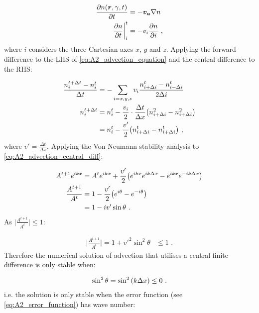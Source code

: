 \begin{equation}
    \begin{aligned}
    \pdv{n\qty(\boldsymbol{r},\gamma,t)}{t}&=-\boldsymbol{v_a}\nabla n  \\
    \pdv{n}{t}\bigg|_{i}^t&=-v_i\pdv{n}{i}\text{ ,} 
    \end{aligned} \label{eq:A2_advection_equation}
\end{equation}
\noindent where $i$ considers the three Cartesian axes $x$, $y$ and $z$. Applying the forward difference to the LHS of \autoref{eq:A2_advection_equation} and the central difference to the RHS:

\begin{equation}
    \begin{aligned}
    \frac{n^{t+\Delta t}_i-n^t_i}{\Delta t}&=-\sum_{i=x,y,z} v_i\frac{n_{i+\Delta i}^t-n_{i-\Delta i}^t}{2\Delta i} \\
    n_i^{t+\Delta t}&=n_i^t-\frac{v_i}{2}\cdot\frac{\Delta t}{\Delta x}\qty(n_{i+\Delta i}^2-n_{i+\Delta i}^2) \\
    &=n_i^t-\frac{v'}{2}\qty(n_{i+\Delta i}^t-n_{i+\Delta i}^t)\text{ ,} 
    \end{aligned} \label{eq:A2_advection_central_diff}
\end{equation}
\noindent where $v'=\frac{\Delta t}{\Delta x}$. Applying the Von Neumann stability analysis to \autoref{eq:A2_advection_central_diff}:

\begin{equation}
    \begin{aligned}
    A^{t+1}e^{ikx}&=A^te^{ikx}+\frac{v'}{2}\qty(e^{ikx}e^{ik\Delta x}-e^{ikx}e^{-ik\Delta x}) \\
    \frac{A^{t+1}}{A^t}&=1-\frac{v'}{2}\qty(e^{i\theta}-e^{-i\theta}) \\
    &=1-iv'\sin\theta\text{ .} 
    \end{aligned}
\end{equation}
\noindent As $\lvert \frac{A^{t+1}}{A^t}\rvert\leq 1$:

\begin{equation}
    \begin{aligned}
        \bigg| \frac{A^{t+1}}{A^t}\bigg|=1+v'^2\sin^2\theta &\leq1\text{ .} 
    \end{aligned}
\end{equation}
\noindent Therefore the numerical solution of advection that utilises a central finite difference is only stable when:

\begin{equation}
    \begin{aligned}
        \sin^2\theta=\sin^2\qty(k\Delta x)\leq 0\text{ .} 
    \end{aligned}
\end{equation}
\noindent i.e. the solution is only stable when the error function (see \autoref{eq:A2_error_function}) has wave number:

